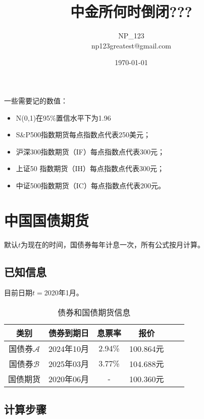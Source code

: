 \documentclass{article}
\title{\huge 中金所何时倒闭???}
\author{NP\_123\\np123greatest@gmail.com}
\date{\today}
\begin{document}
 
\maketitle
\tableofcontents
\clearpage
    一些需要记的数值：
\begin{itemize}
    \item N(0,1)在95\%置信水平下为1.96
    \item S\&P500指数期货每点指数点代表250美元；
    \item 沪深300指数期货（IF）每点指数点代表300元；
    \item 上证50 指数期货（IH）每点指数点代表300元；
    \item 中证500指数期货（IC）每点指数点代表200元。
\end{itemize}

\newpage
\section{中国国债期货}

默认$t$为现在的时间，国债券每年计息一次，所有公式按月计算。

\subsection{已知信息}
目前日期$t=$2020年1月。
\begin{table}[htbp]
    \centering
    \caption{债券和国债期货信息}
    \label{tab:my-table}
    \begin{tabular}{@{}cccccc@{}}
        \toprule
        类别&债券到期日       & 息票率 & 报价   \\ \midrule
        国债券$\mathcal{A} $&2024年10月 & 2.94\%  & 100.864元 \\
        国债券$\mathcal{B} $&2025年03月 & 3.77\%  & 104.688元  \\
        国债期货&2020年06月 & - & 100.360元 \\ \bottomrule
    \end{tabular}
\end{table}

\subsection{计算步骤}
\end{document}
